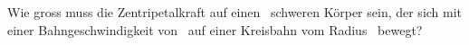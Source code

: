 Wie gross muss die Zentripetalkraft auf einen \mZkO\ schweren Körper sein, der sich mit einer Bahngeschwindigkeit von \vZkO\ auf einer Kreisbahn vom Radius \rZkO\ bewegt?
